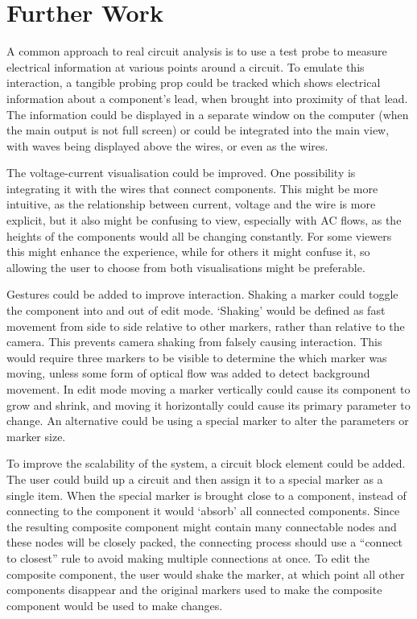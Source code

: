 \section{Further Work}

A common approach to real circuit analysis is to use a test probe to measure electrical information at various points around a circuit. To emulate this interaction, a tangible probing prop could be tracked which shows electrical information about a component's lead, when brought into proximity of that lead. The information could be displayed in a separate window on the computer (when the main output is not full screen) or could be integrated into the main view, with waves being displayed above the wires, or even as the wires.

The voltage-current visualisation could be improved. One possibility is integrating it with the wires that connect components. This might be more intuitive, as the relationship between current, voltage and the wire is more explicit, but it also might be confusing to view, especially with AC flows, as the heights of the components would all be changing constantly. For some viewers this might enhance the experience, while for others it might confuse it, so allowing the user to choose from both visualisations might be preferable.

Gestures could be added to improve interaction. Shaking a marker could toggle the component into and out of edit mode. `Shaking' would be defined as fast movement from side to side relative to other markers, rather than relative to the camera. This prevents camera shaking from falsely causing interaction. This would require three markers to be visible to determine the which marker was moving, unless some form of optical flow was added to detect background movement. In edit mode moving a marker vertically could cause its component to grow and shrink, and moving it horizontally could cause its primary parameter to change. An alternative could be using a special marker to alter the parameters or marker size.

To improve the scalability of the system, a circuit block element could be added. The user could build up a circuit and then assign it to a special marker as a single item. When the special marker is brought close to a component, instead of connecting to the component it would `absorb' all connected components. Since the resulting composite component might contain many connectable nodes and these nodes will be closely packed, the connecting process should use a ``connect to closest'' rule to avoid making multiple connections at once. To edit the composite component, the user would shake the marker, at which point all other components disappear and the original markers used to make the composite component would be used to make changes.

